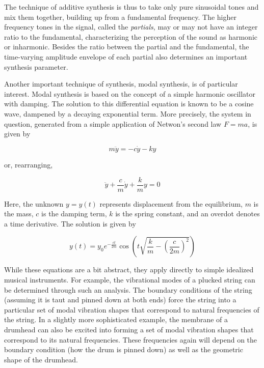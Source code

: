 The technique of additive synthesis is thus to take only pure sinusoidal tones
and mix them together, building up from a fundamental frequency. The higher
frequency tones in the signal, called the {\em partials}, may or may not have
an integer ratio to the fundamental, characterizing the perception of the sound
as harmonic or inharmonic. Besides the ratio between the partial and the fundamental,
the time-varying amplitude envelope of each partial also determines an important
synthesis parameter.

Another important technique of synthesis, modal synthesis, is of particular interest. 
Modal synthesis is based on the concept of a simple harmonic oscillator with damping.
The solution to this differential equation is known to be a cosine wave, dampened by
a decaying exponential term. More precisely, the system in question, generated from
a simple application of Netwon's second law $F = ma$, is given by 

\begin{equation}
m\ddot{y} = -c \dot{y} - ky
\end{equation}

or, rearranging,

\begin{equation}
\label{eq:dampedosc}
\ddot{y} + \frac{c}{m} \dot{y} + \frac{k}{m}y = 0
\end{equation}

Here, the unknown $y = y(t)$ represents displacement from the equilibrium, $m$ is the mass, $c$ is the damping term, $k$ is the spring constant,
and an overdot denotes a time derivative. The solution is given by

\begin{equation}
y(t) = y_0 e^{-\frac{ct}{2m}} \cos\left({t \sqrt{\frac{k}{m} - \left(\frac{c}{2m}\right)^2}}\right)
\end{equation}

While these equations are a bit abstract, they apply directly to simple idealized musical instruments. For example,
the vibrational modes of a plucked string can be determined through such an analysis. The boundary conditions
of the string (assuming it is taut and pinned down at both ends) force the string into a particular set
of modal vibration shapes that correspond to natural frequencies of the string. In a slightly
more sophisticated example, the membrane of a drumhead can also be excited into forming a set of
modal vibration shapes that correspond to its natural frequencies. These frequencies again will depend on the
boundary condition (how the drum is pinned down) as well as the geometric shape of the drumhead. 

